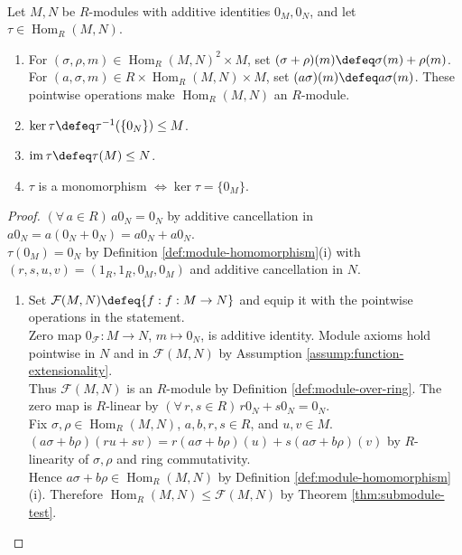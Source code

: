 \begin{proposition} \label{prop:hom-module-kernel-image} \\
Let $M,N$ be $R$-modules with additive identities $0_M,0_N$, and let $\tau\in\operatorname{Hom}_R(M,N)$.
\begin{enumerate}[label=(\roman*)]
\setlength{\itemsep}{0pt}
\item For $(\sigma,\rho,m)\in\operatorname{Hom}_R(M,N)^2\times M$, set $(\sigma+\rho)(m)\defeq\sigma(m)+\rho(m)$.\\
For $(a,\sigma,m)\in R\times\operatorname{Hom}_R(M,N)\times M$, set $(a\sigma)(m)\defeq a\sigma(m)$. These pointwise operations make $\operatorname{Hom}_R(M,N)$ an $R$-module.
\item $\ker\tau\defeq\tau^{-1}(\{0_N\})\leq M$.
\item $\operatorname{im}\tau\defeq\tau(M)\leq N$.
\item $\tau$ is a monomorphism $\Longleftrightarrow\ker\tau=\{0_M\}$.
\end{enumerate}
\begin{proof}
$(\forall\,a\in R)\,a0_N=0_N$ by additive cancellation in $a0_N=a(0_N+0_N)=a0_N+a0_N$.\\
$\tau(0_M)=0_N$ by Definition \ref{def:module-homomorphism}(i) with $(r,s,u,v)=(1_R,1_R,0_M,0_M)$ and additive cancellation in $N$.
\begin{enumerate}[label=(\roman*)]
\setlength{\itemsep}{0pt}
\item[$(i)$] Set $\mathcal{F}(M,N)\defeq\{f:f:M\to N\}$ and equip it with the pointwise operations in the statement.\\
Zero map $0_{\mathcal{F}}:M\to N$, $m\mapsto0_N$, is additive identity. Module axioms hold pointwise in $N$ and in $\mathcal{F}(M,N)$ by Assumption \ref{assump:function-extensionality}.\\
Thus $\mathcal{F}(M,N)$ is an $R$-module by Definition \ref{def:module-over-ring}. The zero map is $R$-linear by $(\forall\,r,s\in R)\,r0_N+s0_N=0_N$.\\
Fix $\sigma,\rho\in\operatorname{Hom}_R(M,N)$, $a,b,r,s\in R$, and $u,v\in M$.\\
$(a\sigma+b\rho)(ru+sv)=r(a\sigma+b\rho)(u)+s(a\sigma+b\rho)(v)$ by $R$-linearity of $\sigma,\rho$ and ring commutativity.\\
Hence $a\sigma+b\rho\in\operatorname{Hom}_R(M,N)$ by Definition \ref{def:module-homomorphism}(i). Therefore $\operatorname{Hom}_R(M,N)\leq\mathcal{F}(M,N)$ by Theorem \ref{thm:submodule-test}.

\end{enumerate}
\end{proof}
\end{proposition}
